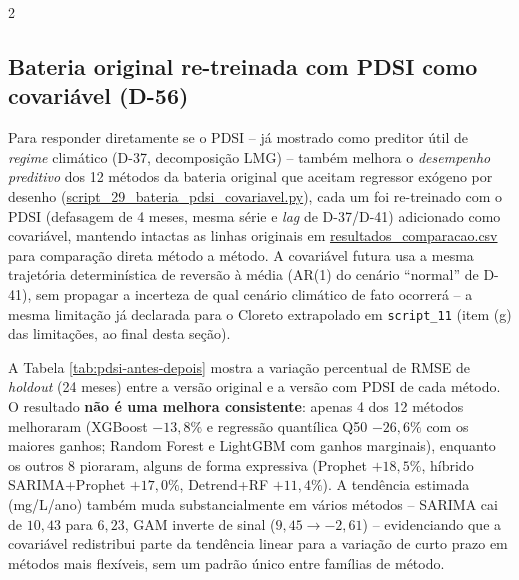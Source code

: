 \begin{multicols*}{2}
\subsection{Bateria original re-treinada com PDSI como covariável (D-56)}

Para responder diretamente se o PDSI -- já mostrado como preditor útil de \textit{regime} climático (D-37, decomposição LMG) -- também melhora o \textit{desempenho preditivo} dos 12 métodos da bateria original que aceitam regressor exógeno por desenho (\url{script_29_bateria_pdsi_covariavel.py}), cada um foi re-treinado com o PDSI (defasagem de 4 meses, mesma série e \textit{lag} de D-37/D-41) adicionado como covariável, mantendo intactas as linhas originais em \url{resultados_comparacao.csv} para comparação direta método a método. A covariável futura usa a mesma trajetória determinística de reversão à média (AR(1) do cenário ``normal'' de D-41), sem propagar a incerteza de qual cenário climático de fato ocorrerá -- a mesma limitação já declarada para o Cloreto extrapolado em \texttt{script\_11} (item (g) das limitações, ao final desta seção).

A Tabela \ref{tab:pdsi-antes-depois} mostra a variação percentual de RMSE de \textit{holdout} (24 meses) entre a versão original e a versão com PDSI de cada método. O resultado \textbf{não é uma melhora consistente}: apenas 4 dos 12 métodos melhoraram (XGBoost $-13{,}8\%$ e regressão quantílica Q50 $-26{,}6\%$ com os maiores ganhos; Random Forest e LightGBM com ganhos marginais), enquanto os outros 8 pioraram, alguns de forma expressiva (Prophet $+18{,}5\%$, híbrido SARIMA+Prophet $+17{,}0\%$, Detrend+RF $+11{,}4\%$). A tendência estimada (mg/L/ano) também muda substancialmente em vários métodos -- SARIMA cai de $10{,}43$ para $6{,}23$, GAM inverte de sinal ($9{,}45 \to -2{,}61$) -- evidenciando que a covariável redistribui parte da tendência linear para a variação de curto prazo em métodos mais flexíveis, sem um padrão único entre famílias de método.

\end{multicols*}
